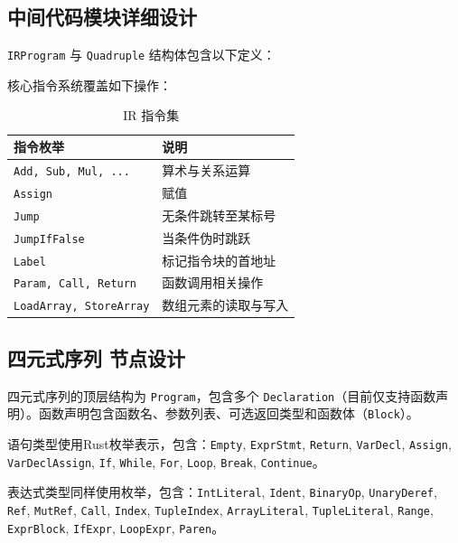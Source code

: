 \documentclass[12pt,a4paper]{ctexart}
\begin{document}
\subsection{中间代码模块详细设计}

\texttt{IRProgram} 与 \texttt{Quadruple} 结构体包含以下定义：



核心指令系统覆盖如下操作：

\begin{table}[H]
\centering
\small
\caption{IR 指令集}
\begin{tabular}{ll}
\toprule
\textbf{指令枚举} & \textbf{说明} \\
\midrule
\texttt{Add, Sub, Mul, ...} & 算术与关系运算 \\
\texttt{Assign} & 赋值 \\
\texttt{Jump} & 无条件跳转至某标号 \\
\texttt{JumpIfFalse} & 当条件伪时跳跃 \\
\texttt{Label} & 标记指令块的首地址 \\
\texttt{Param, Call, Return} & 函数调用相关操作 \\
\texttt{LoadArray, StoreArray} & 数组元素的读取与写入 \\
\bottomrule
\end{tabular}
\end{table}

\subsection{四元式序列 节点设计}

四元式序列的顶层结构为 \texttt{Program}，包含多个 \texttt{Declaration}（目前仅支持函数声明）。函数声明包含函数名、参数列表、可选返回类型和函数体（\texttt{Block}）。

语句类型使用Rust枚举表示，包含：\texttt{Empty}, \texttt{ExprStmt}, \texttt{Return}, \texttt{VarDecl}, \texttt{Assign}, \texttt{VarDeclAssign}, \texttt{If}, \texttt{While}, \texttt{For}, \texttt{Loop}, \texttt{Break}, \texttt{Continue}。

表达式类型同样使用枚举，包含：\texttt{IntLiteral}, \texttt{Ident}, \texttt{BinaryOp}, \texttt{UnaryDeref}, \texttt{Ref}, \texttt{MutRef}, \texttt{Call}, \texttt{Index}, \texttt{TupleIndex}, \texttt{ArrayLiteral}, \texttt{TupleLiteral}, \texttt{Range}, \texttt{ExprBlock}, \texttt{IfExpr}, \texttt{LoopExpr}, \texttt{Paren}。
\end{document}
